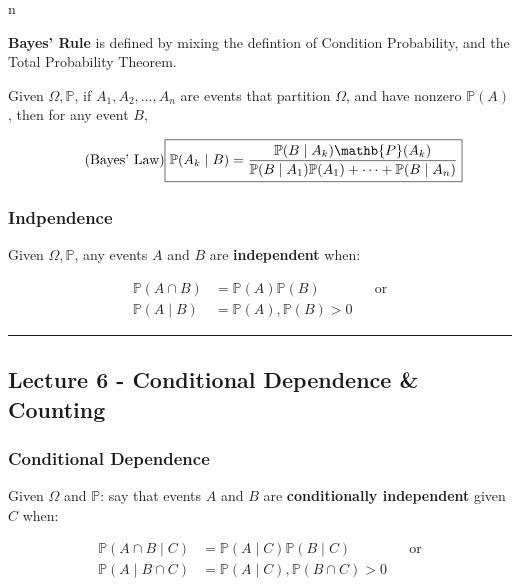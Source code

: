 n\documentclass{article}
\begin{document}
\textbf{Bayes' Rule} is defined by mixing the defintion of Condition
Probability, and the Total Probability Theorem.

Given $\Omega, \mathbb{P}$, if $A_1, A_2, \dots, A_n$ are events that
partition $\Omega$, and have nonzero $\mathbb{P}(A)$, then for any
event $B$,

\begin{equation}
  \tag{Bayes' Law}
  \boxed{
    \mathbb{P}(A_k \mid B) =
    \frac{\mathbb{P}(B \mid A_k) \mathb{P}(A_k)}
    {\mathbb{P}(B \mid A_1) \mathbb{P}(A_1) + \dots + \mathbb{P}(B
      \mid A_n)}
  }
\end{equation}

\subsubsection{Indpendence}

Given $\Omega, \mathbb{P}$, any events $A$ and $B$ are
\textbf{independent} when:

\begin{equation}
  \tag{Independence Def}
  \boxed{
    \begin{aligned}
      \mathbb{P}(A \cap B)
      &= \mathbb{P}(A) \mathbb{P}(B)
      && \text{or} \\
      \mathbb{P}(A \mid B)
      &= \mathbb{P}(A), \mathbb{P}(B) > 0
    \end{aligned}
  }
\end{equation}


\medskip\hrule
\subsection{Lecture 6 - Conditional Dependence \& Counting}

\subsubsection{Conditional Dependence}

Given $\Omega$ and $\mathbb{P}$: say that events $A$ and $B$ are
\textbf{conditionally independent} given $C$ when:

\begin{equation}
  \tag{Conditional Independence Def}
  \boxed{
    \begin{aligned}
      \mathbb{P}(A \cap B \mid C)
      &= \mathbb{P}(A \mid C) \mathbb{P}(B \mid C)
      && \text{or} \\
      \mathbb{P}(A \mid B \cap C)
      &= \mathbb{P}(A \mid C), \mathbb{P}(B \cap C) > 0
    \end{aligned}
  }
\end{equation}
\end{document}
